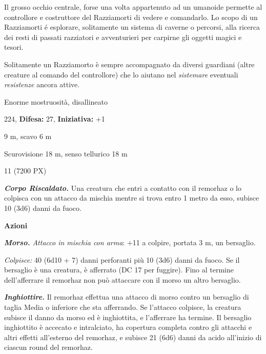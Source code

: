 \begin{multicols}{2}
{Il grosso occhio centrale, forse una volta appartenuto ad un umanoide permette al controllore e costruttore del Razziamorti di vedere e comandarlo. Lo scopo di un Razziamorti é esplorare, solitamente un sistema di caverne o percorsi, alla ricerca dei resti di passati razziatori e avventurieri per carpirne gli oggetti magici e tesori.

Solitamente un Razziamorto è sempre accompagnato da diversi guardiani (altre creature al comando del controllore) che lo aiutano nel \emph{sistemare} eventuali \emph{resistenze} ancora attive.

\noindent
\begin{description}[noitemsep, topsep=0pt, parsep=0pt, partopsep=0pt, leftmargin=0cm, labelwidth=2.2cm]
	\item[\textbf{Taglia/Tipo:}] Enorme mostruosità, disallineato
	\item[\textbf{Caratt.:}] 
	\item[\textbf{Punti Ferita:}] 224,  \textbf{Difesa:} 27,  \textbf{Iniziativa:} +1
	\item[\textbf{Movimento:}] 9 m, scavo 6 m
	\item[\textbf{Tiri Salvez.:}] 
	\item[\textbf{Sensi:}] Scurovisione 18 m, senso tellurico 18 m
	\item[\textbf{Sfida:}] 11 (7200 PX)\smallskip
\end{description}

\emph{\textbf{Corpo Riscaldato.}} Una creatura che entri a contatto con il remorhaz o lo colpisca con un attacco da mischia mentre si trova entro 1 metro da esso, subisce 10 (3d6) danni da fuoco.

\textbf{Azioni}

\emph{\textbf{Morso.} Attacco in mischia con arma}: +11 a colpire, portata 3 m, un bersaglio.

\emph{Colpisce:} 40 (6d10 + 7) danni perforanti più 10 (3d6) danni da fuoco. Se il bersaglio è una creatura, è afferrato (DC 17 per fuggire). Fino al termine dell'afferrare  il remorhaz non può attaccare con il morso un altro bersaglio.

\emph{\textbf{Inghiottire.}} Il remorhaz effettua una attacco di morso contro un bersaglio di taglia Media o inferiore che sta afferrando. Se l'attacco colpisce, la creatura subisce il danno da morso ed è inghiottita, e l'afferrare ha termine. Il bersaglio inghiottito è accecato e intralciato, ha copertura completa contro gli attacchi e altri effetti all'esterno del remorhaz, e subisce 21 (6d6) danni da acido all'inizio di ciascun round del remorhaz.

}
\end{multicols}
